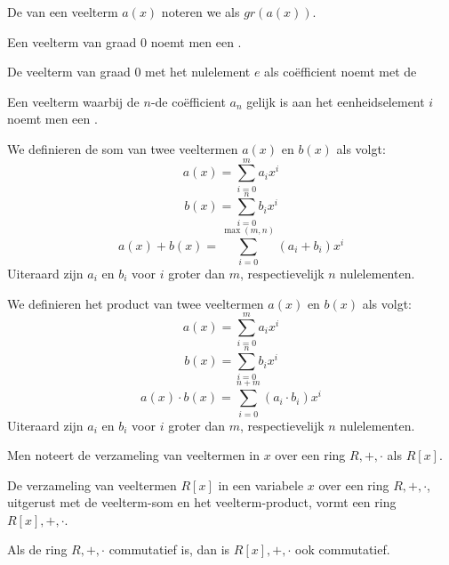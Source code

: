 \documentclass[main.tex]{subfiles}
\begin{document}
\begin{de}
  De  van een veelterm $a(x)$ noteren we als $gr(a(x))$.
\end{de}

\begin{de}
  Een veelterm van graad $0$ noemt men een .
\end{de}

\begin{de}
  De veelterm van graad $0$ met het nulelement $e$ als co\"efficient noemt met de 
\end{de}

\begin{de}
  Een veelterm waarbij de $n$-de co\"efficient $a_{n}$ gelijk is aan het eenheidselement $i$ noemt men een .
\end{de}

\begin{de}
  We definieren de som van twee veeltermen $a(x)$ en $b(x)$ als volgt:
  \[ a(x) = \sum_{i=0}^{m}a_{i}x^{i} \]
  \[ b(x) = \sum_{i=0}^{n}b_{i}x^{i} \]
  \[  a(x) + b(x) = \sum_{i=0}^{\max(m,n)}(a_{i} + b_{i})x^{i} \]
  Uiteraard zijn $a_{i}$ en $b_{i}$ voor $i$ groter dan $m$, respectievelijk $n$ nulelementen.
\end{de}

\begin{de}
  We definieren het product van twee veeltermen $a(x)$ en $b(x)$ als volgt:
  \[ a(x) = \sum_{i=0}^{m}a_{i}x^{i} \]
  \[ b(x) = \sum_{i=0}^{n}b_{i}x^{i} \]
  \[  a(x)\cdot b(x) = \sum_{i=0}^{n+m}(a_{i} \cdot b_{i})x^{i} \]
  Uiteraard zijn $a_{i}$ en $b_{i}$ voor $i$ groter dan $m$, respectievelijk $n$ nulelementen.
\end{de}

\begin{de}
  Men noteert de verzameling van veeltermen in $x$ over een ring $R,+,\cdot$ als $R[x]$.
\end{de}

\begin{ei}
  De verzameling van veeltermen $R[x]$ in een variabele $x$ over een ring $R,+,\cdot$, uitgerust met de veelterm-som en het veelterm-product, vormt een ring $R[x],+,\cdot$.
\end{ei}

\begin{st}
  Als de ring $R,+,\cdot$ commutatief is, dan is $R[x],+,\cdot$ ook commutatief.
\end{st}
\end{document}
